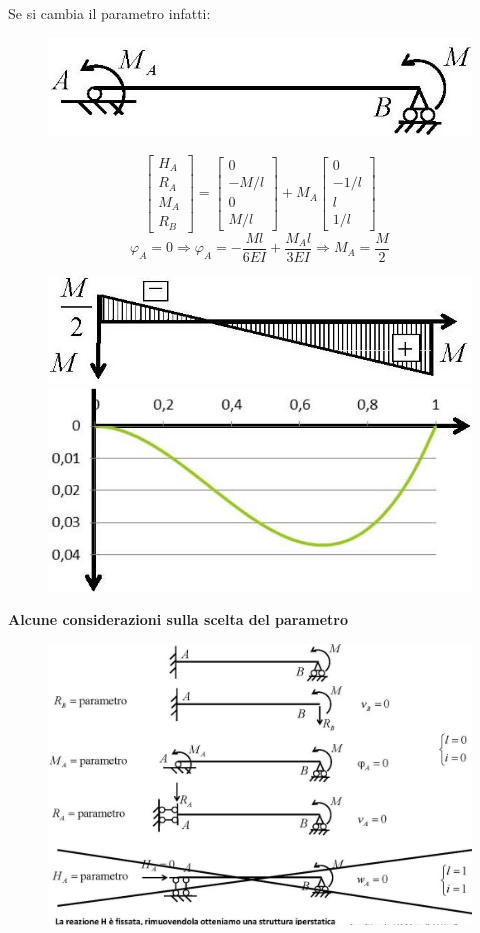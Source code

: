 \documentclass{article}
\begin{document}
\begin{adjustwidth}{2in}{}
		Se si cambia il parametro infatti:
		
\begin{figure}[H]
	\centering
	\includegraphics[width=0.4\linewidth]{"immagini/1.PARTE8_Pagina_45 (2)"}	
\end{figure}

			\[
		\left[ \begin{array}{c}
			H_A \\
			R_A \\
			M_A \\
			R_B
		\end{array}\right] = \left[ \begin{array}{c}
			0 \\
			-M/l\\
			0 \\
			M/l
		\end{array}\right] + M_A \left[ \begin{array}{c}
			0 \\
			-1/l \\
			l \\
			1/l
		\end{array}\right] \]
		\[
			\varphi_A = 0 \Rightarrow \varphi_A = -\dfrac{Ml}{6EI} + \dfrac{M_Al}{3EI} \Rightarrow M_A = \dfrac{M}{2}
		\]

\begin{figure}[H]
	\centering
	\includegraphics[width=0.4\linewidth]{"immagini/1.PARTE8_Pagina_45 (3)"}
	\includegraphics[width=0.4\linewidth]{"immagini/1.PARTE8_Pagina_45"}
\end{figure}

\textbf{Alcune considerazioni sulla scelta del parametro} \newline 
\begin{figure}[H]
	\centering
	\includegraphics[width=0.7\linewidth]{"immagini/1.PARTE8_Pagina_46"}	
\end{figure}


\end{adjustwidth}
\end{document}
